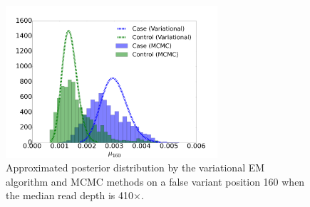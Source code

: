 \documentclass[11pt,reqno]{amsart}
\begin{document}
\begin{figure}[htbp]
\centering
\includegraphics[width=0.7\textwidth]{figs/position_160_410_mcmc_vs_var_mu_fig2.png}
\caption{Approximated posterior distribution by the variational EM algorithm and MCMC methods on a false variant position 160 when the median read depth is 410$\times$.}
\label{tbl:compare2}
\end{figure}
\end{document}
